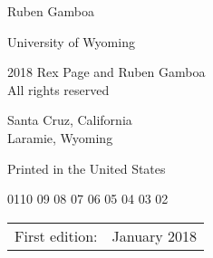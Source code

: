 \documentclass[letterpaper,10pt,extrafontsizesmtwoside,onecolumn,openright,fleqn]{memoir}
\begin{document}
\begin{center}
\LARGE\textsf{Ruben Gamboa}\par
\Large\textsf{University of Wyoming}\par
\end{center}
\vspace*{\fill}
\clearpage

\begingroup
\footnotesize
\setlength{\parindent}{0pt}
\setlength{\parskip}{\baselineskip}
\textcopyright{} 2018 Rex Page and Ruben Gamboa \\
All rights reserved

Santa Cruz, California\\
Laramie, Wyoming

Printed in the United States


\begin{center}
01\hspace{2em}10 09 08 07 06 05 04 03 02
\end{center}
\begin{center}
\begin{tabular}{ll}
First edition:                        & January 2018 \\
\end{tabular}
\end{center}
\end{document}

